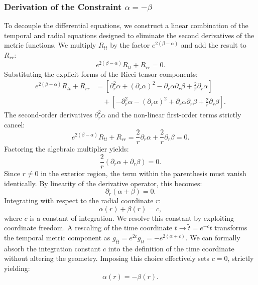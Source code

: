 \documentclass[11pt, a4paper]{report}
\begin{document}
\subsubsection{Derivation of the Constraint $\alpha = -\beta$}
To decouple the differential equations, we construct a linear combination of the temporal and radial equations designed to eliminate the second derivatives of the metric functions. We multiply $R_{tt}$ by the factor $e^{2(\beta-\alpha)}$ and add the result to $R_{rr}$:
\begin{equation}
e^{2(\beta-\alpha)} R_{tt} + R_{rr} = 0.
\end{equation}
Substituting the explicit forms of the Ricci tensor components:
\begin{align}
e^{2(\beta-\alpha)} R_{tt} + R_{rr} &= \left[ \partial_r^2\alpha + (\partial_r\alpha)^2 - \partial_r\alpha\partial_r\beta + \frac{2}{r}\partial_r\alpha \right] \nonumber \\
&\quad + \left[ -\partial_r^2\alpha - (\partial_r\alpha)^2 + \partial_r\alpha\partial_r\beta + \frac{2}{r}\partial_r\beta \right].
\end{align}
The second-order derivatives $\partial_r^2\alpha$ and the non-linear first-order terms strictly cancel:
\begin{equation}
e^{2(\beta-\alpha)} R_{tt} + R_{rr} = \frac{2}{r}\partial_r\alpha + \frac{2}{r}\partial_r\beta = 0.
\end{equation}
Factoring the algebraic multiplier yields:
\begin{equation}
\frac{2}{r} \left( \partial_r\alpha + \partial_r\beta \right) = 0.
\end{equation}
Since $r \neq 0$ in the exterior region, the term within the parenthesis must vanish identically. By linearity of the derivative operator, this becomes:
\begin{equation}
\partial_r \left( \alpha + \beta \right) = 0.
\end{equation}
Integrating with respect to the radial coordinate $r$:
\begin{equation}
\alpha(r) + \beta(r) = c,
\end{equation}
where $c$ is a constant of integration. We resolve this constant by exploiting coordinate freedom. A rescaling of the time coordinate $t \rightarrow \tilde{t} = e^{-c} t$ transforms the temporal metric component as $g_{\tilde{t}\tilde{t}} = e^{2c} g_{tt} = -e^{2(\alpha + c)}$. We can formally absorb the integration constant $c$ into the definition of the time coordinate without altering the geometry. Imposing this choice effectively sets $c = 0$, strictly yielding:
\begin{equation}
\alpha(r) = -\beta(r).
\end{equation}
\end{document}
